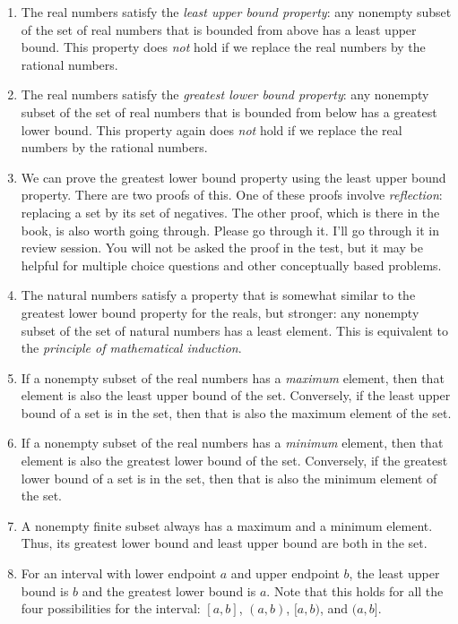 \documentclass{amsart}
\begin{document}
\begin{enumerate}
\item The real numbers satisfy the {\em least upper bound property}:
  any nonempty subset of the set of real numbers that is bounded from
  above has a least upper bound. This property does {\em not} hold if
  we replace the real numbers by the rational numbers.
\item The real numbers satisfy the {\em greatest lower bound
  property}: any nonempty subset of the set of real numbers that is
  bounded from below has a greatest lower bound. This property again
  does {\em not} hold if we replace the real numbers by the rational
  numbers.
\item We can prove the greatest lower bound property using the least
  upper bound property. There are two proofs of this. One of these
  proofs involve {\em reflection}: replacing a set by its set of
  negatives. The other proof, which is there in the book, is also
  worth going through. Please go through it. I'll go through it in
  review session. You will not be asked the proof in the test, but it
  may be helpful for multiple choice questions and other conceptually
  based problems.
\item The natural numbers satisfy a property that is somewhat similar
  to the greatest lower bound property for the reals, but stronger:
  any nonempty subset of the set of natural numbers has a least
  element. This is equivalent to the {\em principle of mathematical
  induction}.
\item If a nonempty subset of the real numbers has a {\em maximum}
  element, then that element is also the least upper bound of the
  set. Conversely, if the least upper bound of a set is in the set,
  then that is also the maximum element of the set.
\item If a nonempty subset of the real numbers has a {\em minimum}
  element, then that element is also the greatest lower bound of the
  set. Conversely, if the greatest lower bound of a set is in the set,
  then that is also the minimum element of the set.
\item A nonempty finite subset always has a maximum and a minimum
  element. Thus, its greatest lower bound and least upper bound are
  both in the set.
\item For an interval with lower endpoint $a$ and upper endpoint $b$,
  the least upper bound is $b$ and the greatest lower bound is
  $a$. Note that this holds for all the four possibilities for the
  interval: $[a,b]$, $(a,b)$, $[a,b)$, and $(a,b]$.

\end{enumerate}
\end{document}
